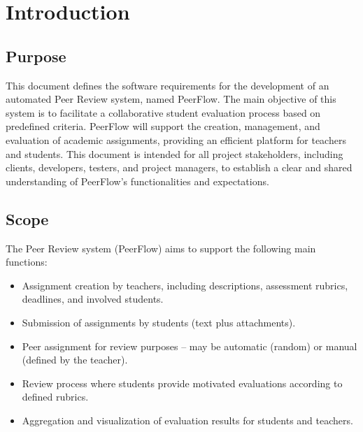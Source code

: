 \chapter{Introduction}
\section{Purpose}

\begin{justify}
    This document defines the software requirements for the development of an automated Peer Review system, named PeerFlow. The main objective of this system is to facilitate a collaborative student evaluation process based on predefined criteria. PeerFlow will support the creation, management, and evaluation of academic assignments, providing an efficient platform for teachers and students. This document is intended for all project stakeholders, including clients, developers, testers, and project managers, to establish a clear and shared understanding of PeerFlow's functionalities and expectations.
\end{justify}

\section{Scope}

\begin{justify}
    The Peer Review system (PeerFlow) aims to support the following main functions:
    \begin{itemize}
        \item Assignment creation by teachers, including descriptions, assessment rubrics, deadlines, and involved students.
        \item Submission of assignments by students (text plus attachments).
        \item Peer assignment for review purposes -- may be automatic (random) or manual (defined by the teacher).
        \item Review process where students provide motivated evaluations according to defined rubrics.
        \item Aggregation and visualization of evaluation results for students and teachers.
    \end{itemize}
\end{justify}

